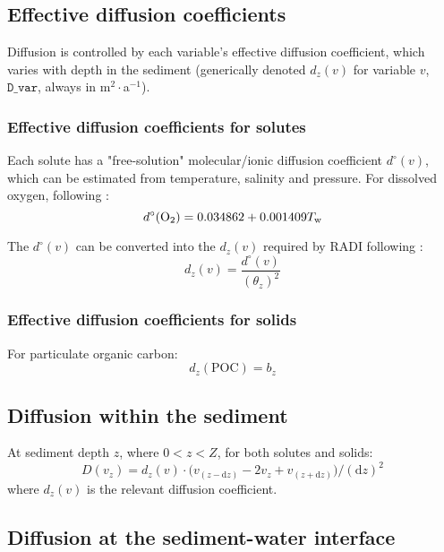 \documentclass[a4paper]{article}
\newcommand{\D}[1]{\mathrm{d}#1}
\newcommand{\code}[1]{\texttt{#1}}
\begin{document}
\subsection{Effective diffusion coefficients}

Diffusion is controlled by each variable's effective diffusion coefficient, which varies with depth in the sediment (generically denoted $d_z(v)$ for variable $v$, $\code{D\_var}$, always in m$^2\cdot$a$^{-1}$).

\subsubsection{Effective diffusion coefficients for solutes}

Each solute has a "free-solution" molecular/ionic diffusion coefficient $d^\circ(v)$, which can be estimated from temperature, salinity and pressure. For dissolved oxygen, following \citet{li_diffusion_1974}:
\begin{equation}
d^\circ(\ce{O2}) = 0.034862 + 0.001409 T_\mathrm{w}
\end{equation}

The $d^\circ(v)$ can be converted into the $d_z(v)$ required by RADI following \citet{boudreau_method--lines_1996}:
\begin{equation}
d_z(v) = \frac{d^\circ(v)}{(\theta_z)^2}
\end{equation}

\subsubsection{Effective diffusion coefficients for solids}

For particulate organic carbon:
\begin{equation}
d_z(\mathrm{POC}) = b_z
\end{equation}

\subsection{Diffusion within the sediment}

At sediment depth $z$, where $0 < z < Z$, for both solutes and solids:
\begin{equation}\label{eq:diffusion}
D(v_z) = d_z(v) \cdot \big( v_{(z-\D{z})} - 2 v_z + v_{(z+\D{z})} \big) / (\D{z})^2
\end{equation}
where $d_z(v)$ is the relevant diffusion coefficient.

\subsection{Diffusion at the sediment-water interface}\label{sx:diffusion_surface}
\end{document}
